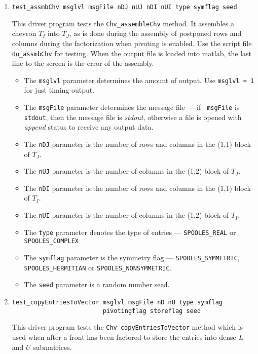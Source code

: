 \begin{enumerate}
\item
\begin{verbatim}
test_assmbChv msglvl msgFile nDJ nUJ nDI nUI type symflag seed
\end{verbatim}
This driver program tests the {\tt Chv\_assembleChv} method.
It assembles a chevron $T_I$ into $T_J$, as is done during the
assembly of postponed rows and columns during the factorization
when pivoting is enabled.
Use the script file {\tt do\_assmbChv} for testing.
When the output file is loaded into matlab,
the last line to the screen is the error of the assembly.
\par
\begin{itemize}
\item
The {\tt msglvl} parameter determines the amount of output.
Use {\tt msglvl = 1} for just timing output.
\item
The {\tt msgFile} parameter determines the message file --- if {\tt
msgFile} is {\tt stdout}, then the message file is {\it stdout},
otherwise a file is opened with {\it append} status to receive any
output data.
\item
The {\tt nDJ} parameter is the number of rows and columns 
in the (1,1) block of $T_J$.
\item
The {\tt nUJ} parameter is the number of columns 
in the (1,2) block of $T_J$.
\item
The {\tt nDI} parameter is the number of rows and columns 
in the (1,1) block of $T_I$.
\item
The {\tt nUI} parameter is the number of columns 
in the (1,2) block of $T_I$.
\item
The {\tt type} parameter denotes the type of entries ---
{\tt SPOOLES\_REAL} or {\tt SPOOLES\_COMPLEX} 
\item
The {\tt symflag} parameter is the symmetry flag ---
{\tt SPOOLES\_SYMMETRIC}, {\tt SPOOLES\_HERMITIAN}
or {\tt SPOOLES\_NONSYMMETRIC}.
\item
The {\tt seed} parameter is a random number seed.
\end{itemize}
\item
\begin{verbatim}
test_copyEntriesToVector msglvl msgFile nD nU type symflag 
                         pivotingflag storeflag seed 
\end{verbatim}
This driver program tests the {\tt Chv\_copyEntriesToVector} method
which is used when after a front has been factored to store the
entries into dense $L$ and $U$ submatrices.

\end{enumerate}
